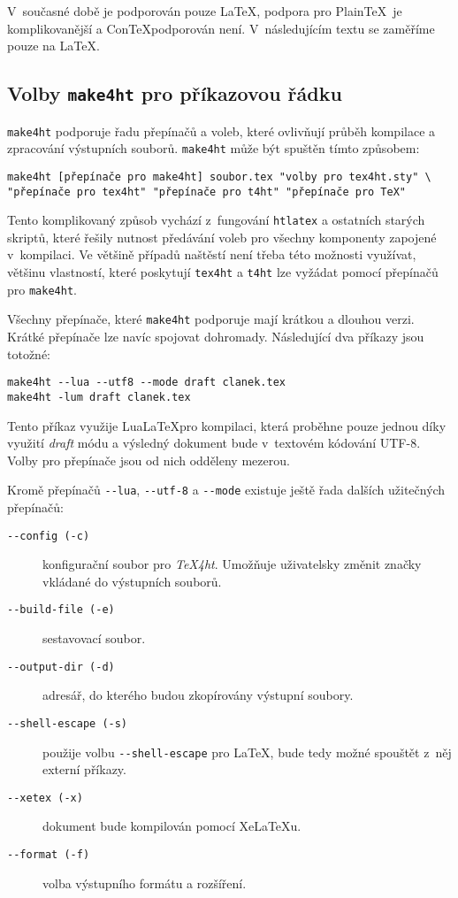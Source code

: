 \documentclass{csbulletin}
\newcommand\nazev[1]{\textit{#1}}
\newcommand\prikaz[1]{\texttt{#1}}
\newcommand\prepinac[1]{\texttt{-\/-#1}}
\begin{document}
V~současné době je podporován pouze \LaTeX, podpora pro Plain\TeX\ je
komplikovanější a Con\TeX podporován není. V~následujícím textu
se zaměříme pouze na \LaTeX.

\subsection{Volby \prikaz{make4ht} pro příkazovou řádku}

\prikaz{make4ht} podporuje řadu přepínačů a voleb, které ovlivňují průběh kompilace a zpracování výstupních souborů. \prikaz{make4ht} může být spuštěn tímto způsobem:

\begin{verbatim}
make4ht [přepínače pro make4ht] soubor.tex "volby pro tex4ht.sty" \
"přepínače pro tex4ht" "přepínače pro t4ht" "přepínače pro TeX"
\end{verbatim}

Tento komplikovaný způsob vychází z~fungování \prikaz{htlatex} a ostatních
starých skriptů, které řešily nutnost předávání voleb pro všechny komponenty
zapojené v~kompilaci. Ve většině případů naštěstí není třeba této možnosti
využívat, většinu vlastností, které poskytují \prikaz{tex4ht} a \prikaz{t4ht}
lze vyžádat pomocí přepínačů pro \prikaz{make4ht}.

Všechny přepínače, které \prikaz{make4ht} podporuje mají krátkou a dlouhou
verzi. Krátké přepínače lze navíc spojovat dohromady. Následující dva příkazy
jsou totožné:

\begin{verbatim}
make4ht --lua --utf8 --mode draft clanek.tex
make4ht -lum draft clanek.tex
\end{verbatim}

Tento příkaz využije Lua\LaTeX pro kompilaci, která proběhne pouze jednou díky
využití \nazev{draft} módu a výsledný dokument bude v~textovém kódování UTF-8.
Volby pro přepínače jsou od nich odděleny mezerou.

Kromě přepínačů \prepinac{lua}, \prepinac{utf-8} a \prepinac{mode} existuje ještě řada dalších užitečných přepínačů:

\begin{description}
  \item[\prepinac{config (-c)}] konfigurační soubor pro \nazev{TeX4ht}. Umožňuje uživatelsky změnit značky vkládané do výstupních souborů.
  \item[\prepinac{build-file (-e)}] sestavovací soubor.
  \item[\prepinac{output-dir (-d)}] adresář, do kterého budou zkopírovány výstupní soubory.
  \item[\prepinac{shell-escape (-s)}] použije volbu \verb|--shell-escape| pro \LaTeX, bude tedy možné spouštět z~něj externí příkazy.
  \item[\prepinac{xetex (-x)}] dokument bude kompilován pomocí Xe\LaTeX u.
  \item[\prepinac{format (-f)}] volba výstupního formátu a rozšíření.
\end{description}
\end{document}
